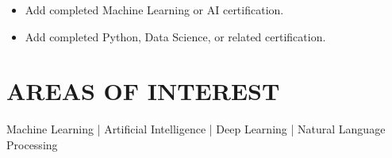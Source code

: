 \documentclass[10pt,a4paper]{article}
\begin{document}
\begin{itemize}
\item Add completed Machine Learning or AI certification.
\item Add completed Python, Data Science, or related certification.
\end{itemize}

\section*{AREAS OF INTEREST}

Machine Learning \quad | \quad Artificial Intelligence \quad | \quad Deep Learning \quad | \quad Natural Language Processing
\end{document}
